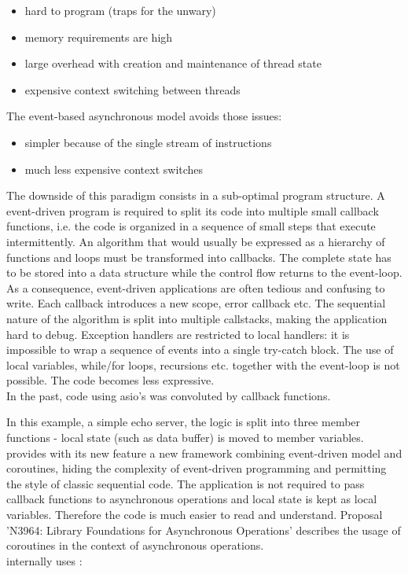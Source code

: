 \begin{itemize}
    \item hard to program (traps for the unwary)
    \item memory requirements are high
    \item large overhead with creation and maintenance of thread state
    \item expensive context switching between threads
\end{itemize}

The event-based asynchronous model avoids those issues:

\begin{itemize}
    \item simpler because of the single stream of instructions
    \item much less expensive context switches
\end{itemize}

The downside of this paradigm consists in a sub-optimal program
structure. A event-driven program is required to split its code into
multiple small callback functions, i.e. the code is organized in a sequence of
small steps that execute intermittently. An algorithm that would usually be
expressed as a hierarchy of functions and loops must be transformed into
callbacks. The complete state has to be stored into a data structure while the
control flow returns to the event-loop.\\
As a consequence, event-driven applications are often tedious and confusing to
write. Each callback introduces a new scope, error callback etc. The
sequential nature of the algorithm is split into multiple callstacks,
making the application hard to debug. Exception handlers are restricted to
local handlers: it is impossible to wrap a sequence of events into a single
try-catch block.
The use of local variables, while/for loops, recursions etc. together with the
event-loop is not possible. The code becomes less expressive.\\
\newline
In the past, code using asio's \asyncops was convoluted by
callback functions.

In this example, a simple echo server, the logic is split into three member
functions - local state (such as data buffer) is moved to member variables.\\
\newline
\boostasio provides with its new \asyncres feature a new
framework combining event-driven model and coroutines, hiding the complexity
of event-driven programming and permitting the style of classic sequential code.
The application is not required to pass callback functions to asynchronous
operations and local state is kept as local variables. Therefore the code
is much easier to read and understand.
Proposal 'N3964: Library Foundations for Asynchronous Operations'\cite{n3964}
describes the usage of coroutines in the context of asynchronous operations.\\
\yieldcontext internally uses \boostcoroutine:

